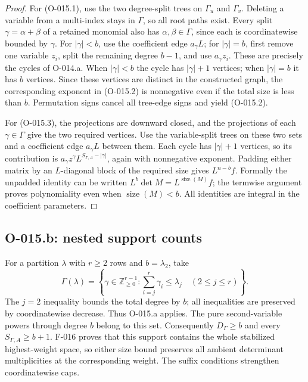 \begin{proof}
For (O-015.1), use the two degree-split trees on
$\Gamma_u$ and $\Gamma_v$. Deleting a variable from a
multi-index stays in $\Gamma$, so all root paths exist.
Every split $\gamma=\alpha+\beta$ of a retained monomial
also has $\alpha,\beta\in\Gamma$, since each is coordinatewise
bounded by $\gamma$. For $|\gamma|<b$, use the coefficient
edge $a_\gamma L$; for $|\gamma|=b$, first remove one
variable $z_i$, split the remaining degree $b-1$, and use
$a_\gamma z_i$. These are precisely the cycles of O-014.a.
When $|\gamma|<b$ the cycle has $|\gamma|+1$ vertices;
when $|\gamma|=b$ it has $b$ vertices. Since these vertices
are distinct in the constructed graph, the corresponding
exponent in (O-015.2) is nonnegative even if the total size
is less than $b$. Permutation signs cancel all tree-edge
signs and yield (O-015.2).

For (O-015.3), the projections are downward closed, and
the projections of each $\gamma\in\Gamma$ give the two
required vertices. Use the variable-split trees on these
two sets and a coefficient edge $a_\gamma L$ between them.
Each cycle has $|\gamma|+1$ vertices, so its contribution
is $a_\gamma z^\gamma L^{S_{\Gamma,A}-|\gamma|}$, again
with nonnegative exponent. Padding either matrix by an
$L$-diagonal block of the required size gives
$L^{n-b}f$. Formally the unpadded identity can be written
$L^b\det M=L^{\operatorname{size}(M)}f$; the termwise
argument proves polynomiality even when $\operatorname{size}(M)<b$.
All identities are integral in the coefficient parameters.
\end{proof}

\subsection{O-015.b: nested support counts}
For a partition $\lambda$ with $r\geq2$ rows and
$b=\lambda_2$, take
\[
 \Gamma(\lambda)=\left\{\gamma\in\mathbb Z_{\geq0}^{r-1}:
              \sum_{i=j}^r\gamma_i\leq\lambda_j
                         \quad(2\leq j\leq r)\right\}.
                                                               \tag{O-015.4}
\]
The $j=2$ inequality bounds the total degree by $b$;
all inequalities are preserved by coordinatewise decrease.
Thus O-015.a applies. The pure second-variable powers through
degree $b$ belong to this set. Consequently $D_\Gamma\geq b$
and every $S_{\Gamma,A}\geq b+1$.
F-016 proves that this support contains the whole stabilized
highest-weight space, so either size bound preserves all
ambient determinant multiplicities at the corresponding
weight. The suffix conditions strengthen coordinatewise caps.

